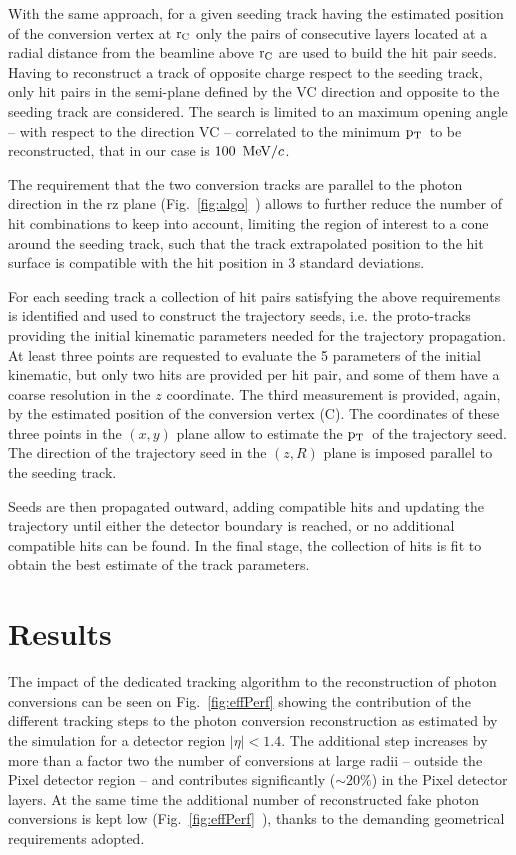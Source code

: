 \documentclass[a4paper]{jpconf}
\def \pt{$\p_{\rm T}$~}
\begin{document}
With the same approach, for a given seeding track  having  the estimated position of the conversion vertex at  $\rm r_C$ only the pairs of consecutive layers located at a radial distance from the beamline above $\rm r_C$ are used to build the hit pair seeds. 
%
Having to reconstruct a track of opposite charge respect to the seeding track, only hit pairs in the semi-plane defined by the VC direction and opposite to the seeding track are considered. The search is limited to an maximum opening angle -- with respect to the direction VC -- correlated to the minimum \pt to be reconstructed, that in our case is $100~{\rm \, MeV}/c$.

The requirement that the two conversion tracks are parallel to the photon direction in the rz plane (Fig.~\ref{fig:algo}~) allows to further   reduce the number of hit combinations to keep into account, limiting the region of interest to a cone around the seeding track, such that the track extrapolated position to the hit surface is compatible with the hit position in 3 standard deviations.  


For each seeding track a collection of hit pairs satisfying the above requirements  is identified and used to construct the trajectory seeds, i.e. the proto-tracks providing the initial kinematic parameters needed for the trajectory propagation.
At least three points are requested to evaluate the 5 parameters of the initial kinematic, but only two hits are provided per hit pair, and some of them have a coarse resolution in the $z$ coordinate. The third measurement is provided, again, by the   estimated position of the conversion vertex (C). The coordinates of these three points in the $(x,y)$ plane allow to estimate the \pt of the trajectory seed. The direction of the trajectory seed in the $(z,R)$ plane is imposed parallel to the seeding track.

Seeds are then
propagated outward, adding compatible hits and updating the trajectory
until either the detector boundary is reached, or no additional
compatible hits can be found.  In the final stage, the collection of
hits is fit to obtain the best estimate of the track parameters.

\section{Results}

The impact of the dedicated tracking algorithm  to the reconstruction of photon conversions
 can be seen on Fig.~\ref{fig:effPerf} 
showing the contribution of the different tracking steps to the photon conversion
reconstruction as estimated by the simulation  for a detector region  $|\eta|<1.4$.
The additional step increases by more than a factor two the number of conversions at large radii -- outside the Pixel detector region -- and contributes significantly ($\sim 20\%$) in the Pixel detector layers. 
 At the same time the additional number of reconstructed fake photon conversions is kept low (Fig.~\ref{fig:effPerf}~), thanks to the demanding geometrical requirements adopted.
 
\end{document}

